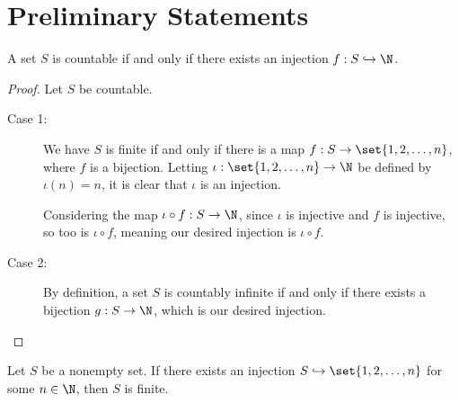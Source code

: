 \documentclass[11pt]{mypackage}
\begin{document}
\RaggedRight
\section{Preliminary Statements}%
\begin{theorem}
  A set $S$ is countable if and only if there exists an injection $f: S\hookrightarrow \N$.
\end{theorem}
\begin{proof}
  Let $S$ be countable.
  \begin{description}
    \item[Case 1:] We have $S$ is finite if and only if there is a map $f: S\rightarrow \set{1,2,\dots,n}$, where $f$ is a bijection. Letting $\iota: \set{1,2,\dots,n} \rightarrow \N$ be defined by $\iota(n) = n$, it is clear that $\iota$ is an injection.\newline

      Considering the map $\iota\circ f: S\rightarrow \N$, since $\iota$ is injective and $f$ is injective, so too is $\iota\circ f$, meaning our desired injection is $\iota\circ f$.
    \item[Case 2:] By definition, a set $S$ is countably infinite if and only if there exists a bijection $g: S\rightarrow \N$, which is our desired injection.
  \end{description}
\end{proof}
\begin{theorem}
  Let $S$ be a nonempty set. If there exists an injection $S\hookrightarrow \set{1,2,\dots,n}$ for some $n\in \N$, then $S$ is finite.

\end{theorem}
\end{document}
